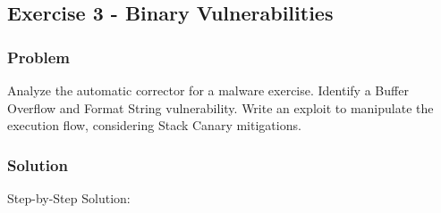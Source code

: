 \documentclass{article}
\begin{document}
\subsection{Exercise 3 - Binary Vulnerabilities}
\subsubsection*{Problem}
Analyze the automatic corrector for a malware exercise. Identify a Buffer Overflow and Format String vulnerability. Write an exploit to manipulate the execution flow, considering Stack Canary mitigations.

\subsubsection*{Solution}
Step-by-Step Solution:
\end{document}
